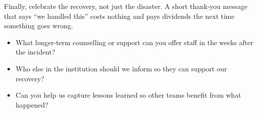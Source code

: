 \documentclass[10pt,letterpaper]{article}
\begin{document}
Finally, celebrate the recovery, not just the disaster. A short thank-you
message that says ``we handled this'' costs nothing and pays dividends the next
time something goes wrong.

\begin{notebox}
  \begin{itemize}
  \item What longer-term counselling or support can you offer staff in the weeks after the incident?
  \item Who else in the institution should we inform so they can support our recovery?
  \item Can you help us capture lessons learned so other teams benefit from what happened?
  \end{itemize}
\end{notebox}

\nocite{*}

\end{document}

